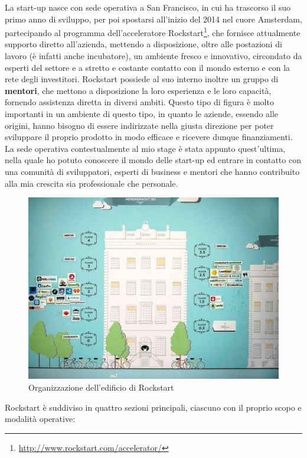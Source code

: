 La start-up nasce con sede operativa a San Francisco, in cui ha trascorso il suo primo anno di sviluppo, per poi spostarsi all'inizio del 2014 nel cuore Amsterdam, partecipando al programma dell'\gls{acceleratore} Rockstart\footnote{\url{http://www.rockstart.com/accelerator/}}, che fornisce attualmente supporto diretto all'azienda, mettendo a disposizione, oltre alle postazioni di lavoro (è infatti anche \gls{incubatore}), un ambiente fresco e innovativo, circondato da esperti del settore e a stretto e costante contatto con il mondo esterno e con la rete degli investitori. Rockstart possiede al suo interno inoltre un gruppo di \textbf{mentori}, che mettono a disposizione la loro esperienza e le loro capacità, fornendo assistenza diretta in diversi ambiti. Questo tipo di figura è molto importanti in un ambiente di questo tipo, in quanto le aziende, essendo alle origini, hanno bisogno di essere indirizzate nella giusta direzione per poter sviluppare il proprio prodotto in modo efficace e ricevere dunque finanziamenti. La sede operativa contestualmente al mio stage è stata appunto quest'ultima, nella quale ho potuto conoscere il mondo delle start-up ed entrare in contatto con una comunità di sviluppatori, esperti di business e mentori che hanno contribuito alla mia crescita sia professionale che personale.

\begin{figure}[htpd]
\centering
\includegraphics[width=\textwidth]{../immagini/rockstart-building}
\caption{Organizzazione dell'edificio di Rockstart}  
\end{figure}


Rockstart è suddiviso in quattro sezioni principali, ciascuno con il proprio scopo e modalità operative:

